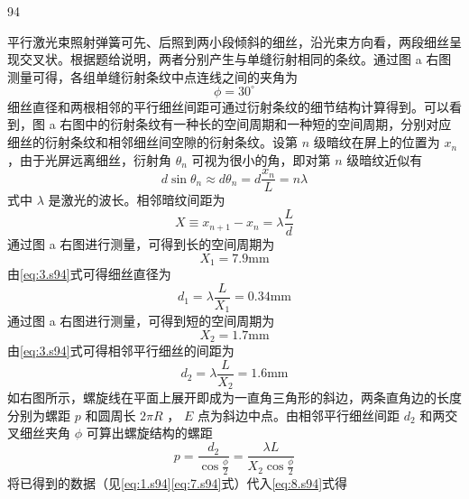 \begin{solution}{94}
\begin{subsolution}
平行激光束照射弹簧可先、后照到两小段倾斜的细丝，沿光束方向看，两段细丝呈现交叉状。根据题给说明，两者分别产生与单缝衍射相同的条纹。通过图 a 右图测量可得，各组单缝衍射条纹中点连线之间的夹角为
\begin{equation}
\phi = 3 0 ^ {\circ}
\label{eq:1.s94}
\end{equation}
细丝直径和两根相邻的平行细丝间距可通过衍射条纹的细节结构计算得到。可以看到，图 a 右图中的衍射条纹有一种长的空间周期和一种短的空间周期，分别对应细丝的衍射条纹和相邻细丝间空隙的衍射条纹。设第 $n$ 级暗纹在屏上的位置为 $x_{n}$ ，由于光屏远离细丝，衍射角 $\theta_{n}$ 可视为很小的角，即对第 $n$ 级暗纹近似有
\begin{equation}
d \sin \theta_ {n} \approx d \theta_ {n} = d \frac {x _ {n}}{L} = n \lambda
\label{eq:2.s94}
\end{equation}
式中 $\lambda$ 是激光的波长。相邻暗纹间距为
\begin{equation}
X \equiv x _ {n + 1} - x _ {n} = \lambda \frac {L}{d}
\label{eq:3.s94}
\end{equation}
通过图 a 右图进行测量，可得到长的空间周期为
\begin{equation}
X _ {1} = 7. 9 \mathrm{mm}
\label{eq:4.s94}
\end{equation}
由\eqref{eq:3.s94}式可得细丝直径为
\begin{equation}
d _ {1} = \lambda \frac {L}{X _ {1}} = 0. 3 4 \mathrm{mm}
\label{eq:5.s94}
\end{equation}
通过图 a 右图进行测量，可得到短的空间周期为
\begin{equation}
X _ {2} = 1. 7 \mathrm{mm}
\label{eq:6.s94}
\end{equation}
由\eqref{eq:3.s94}式可得相邻平行细丝的间距为
\begin{equation}
d _ {2} = \lambda \frac {L}{X _ {2}} = 1. 6 \mathrm{mm}
\label{eq:7.s94}
\end{equation}
如右图所示，螺旋线在平面上展开即成为一直角三角形的斜边，两条直角边的长度分别为螺距 $p$ 和圆周长 $2\pi R$ ， $E$ 点为斜边中点。由相邻平行细丝间距 $d_{2}$ 和两交叉细丝夹角 $\phi$ 可算出螺旋结构的螺距
\begin{equation}
p = \frac {d _ {2}}{\cos \frac {\phi}{2}} = \frac {\lambda L}{X _ {2} \cos \frac {\phi}{2}}
\label{eq:8.s94}
\end{equation}
将已得到的数据（见\eqref{eq:1.s94}\eqref{eq:7.s94}式）代入\eqref{eq:8.s94}式得
\begin{equation}

\end{equation}
\end{subsolution}
\end{solution}
